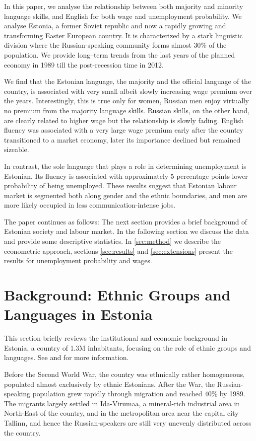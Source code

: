 \documentclass[12pt, a4paper]{article}
\begin{document}
In this paper, we analyse the relationship between both
majority and minority language skills, and English for both
wage and unemployment probability.  We analyse Estonia, a former Soviet republic
and now a rapidly growing and
transforming Easter European country.  It is characterized by a stark linguistic division
where the Russian-speaking community forms almost 30\% of
the population.  We provide long--term trends from the last years
of the planned economy in 1989 till the post-recession time in 2012.

We find that the Estonian language, the majority and the official
language of the country, is associated with very
small albeit slowly increasing wage premium over
the years.  Interestingly, this is true only for women, Russian men enjoy
virtually no premium from the majority language skills.
Russian skills, on the other hand, are clearly related to
higher wage but the relationship is slowly fading.  English fluency was
associated with a very large wage premium early after the country
transitioned to a market economy, later its importance
declined but remained sizeable.  

In contrast, the sole language that plays a role in determining
unemployment is Estonian.  Its fluency is associated with
approximately 5 percentage points lower probability of being unemployed.
These results suggest that Estonian labour market is
segmented both along gender and the ethnic boundaries, and men are
more likely occupied in less communication-intense jobs.


The paper continues as follows: The next section provides a brief
background of Estonian society and labour market. In the following
section we discuss the data and provide some descriptive
statistics. In \cref{sec:method} we describe the econometric
approach, sections \ref{sec:results} and \ref{sec:extensions} present
the results for unemployment probability and wages.


\section{Background: Ethnic Groups and Languages in Estonia}
\label{sec:hist_background}

This section briefly reviews the institutional and economic background
in Estonia, a country of 1.3M inhabitants,
focusing on the role of ethnic groups and languages.
See \citet{Leping2008} and
\citet{lindemann+saar2011Russian2ndGeneration} for more information.

Before the Second World War, the country was ethnically rather
homogeneous, populated almost exclusively by ethnic Estonians. After the War,
the Russian-speaking population grew rapidly through migration and
reached 40\% by 1989.  The migrants largely settled in Ida-Virumaa, a
mineral-rich industrial area in North-East of the country, and in the
metropolitan area near the capital city Tallinn, and hence the
Russian-speakers are still very unevenly distributed across the country.
\end{document}
